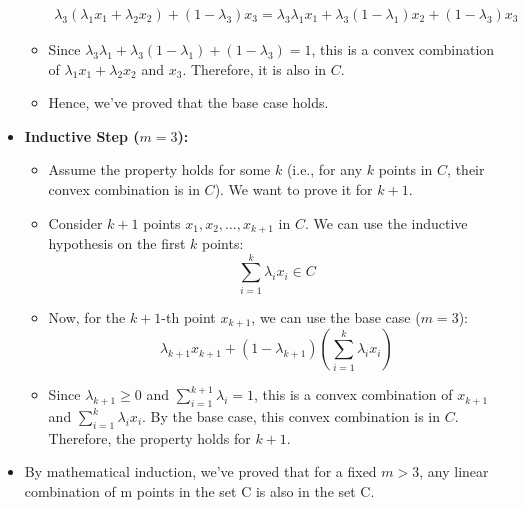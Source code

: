 \documentclass[12pt]{article}
\begin{document}
\begin{itemize}
\begin{itemize}
\begin{equation*}
\begin{split}
                        \lambda_3 (\lambda_1 x_1 + \lambda_2 x_2) + (1 - \lambda_3) x_3 = \lambda_3 \lambda_1 x_1 + \lambda_3 (1-\lambda_1) x_2 + (1-\lambda_3)x_3
                    \end{split}
                \end{equation*}
                \item Since $\lambda_3 \lambda_1 + \lambda_3(1-\lambda_1) + (1-\lambda_3) = 1$, this is a convex combination of $\lambda_1 x_1 + \lambda_2 x_2$ and $x_3$. Therefore, it is also in $C$.
                \item Hence, we've proved that the base case holds.
            \end{itemize}
            \item \textbf{Inductive Step ($m = 3$):}
            \begin{itemize}
                \item Assume the property holds for some \(k\) (i.e., for any \(k\) points in \(C\), their convex combination is in \(C\)). We want to prove it for \(k+1\).
                \item Consider \(k+1\) points \(x_1, x_2, \ldots, x_{k+1}\) in \(C\). We can use the inductive hypothesis on the first \(k\) points:
                \[
                \sum_{i=1}^{k} \lambda_i x_i \in C
                \]
                \item Now, for the \(k+1\)-th point \(x_{k+1}\), we can use the base case (\(m=3\)):
                \[
                \lambda_{k+1} x_{k+1} + (1 - \lambda_{k+1})\left(\sum_{i=1}^{k} \lambda_i x_i\right)
                \]
                \item Since \(\lambda_{k+1} \geq 0\) and \(\sum_{i=1}^{k+1} \lambda_i = 1\), this is a convex combination of \(x_{k+1}\) and \(\sum_{i=1}^{k} \lambda_i x_i\). By the base case, this convex combination is in \(C\). Therefore, the property holds for \(k+1\).
            \end{itemize}
            \item By mathematical induction, we've proved that for a fixed $m > 3$, any linear combination of m points in the set C is also in the set C.
\end{itemize}{}
\end{document}
